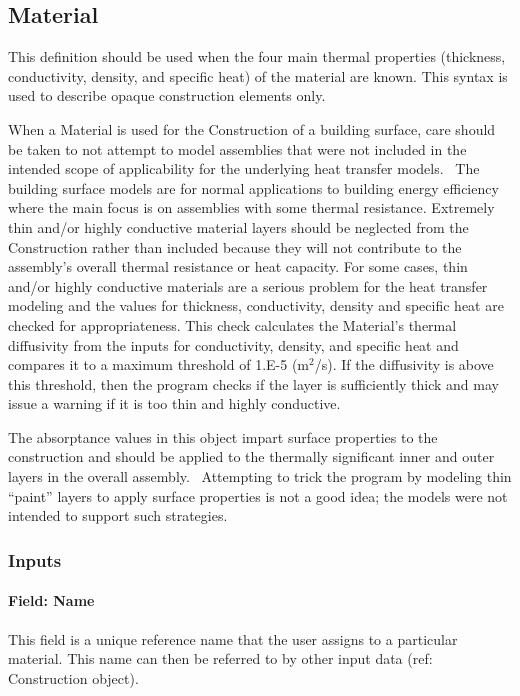 \subsection{Material}\label{material}

This definition should be used when the four main thermal properties (thickness, conductivity, density, and specific heat) of the material are known. This syntax is used to describe opaque construction elements only.

When a Material is used for the Construction of a building surface, care should be taken to not attempt to model assemblies that were not included in the intended scope of applicability for the underlying heat transfer models.~ The building surface models are for normal applications to building energy efficiency where the main focus is on assemblies with some thermal resistance. Extremely thin and/or highly conductive material layers should be neglected from the Construction rather than included because they will not contribute to the assembly's overall thermal resistance or heat capacity. For some cases, thin and/or highly conductive materials are a serious problem for the heat transfer modeling and the values for thickness, conductivity, density and specific heat are checked for appropriateness. This check calculates the Material's thermal diffusivity from the inputs for conductivity, density, and specific heat and compares it to a maximum threshold of 1.E-5 (m\(^{2}\)/s). If the diffusivity is above this threshold, then the program checks if the layer is sufficiently thick and may issue a warning if it is too thin and highly conductive.

The absorptance values in this object impart surface properties to the construction and should be applied to the thermally significant inner and outer layers in the overall assembly.~ Attempting to trick the program by modeling thin ``paint'' layers to apply surface properties is not a good idea; the models were not intended to support such strategies.

\subsubsection{Inputs}\label{inputs-046}

\paragraph{Field: Name}\label{field-name-045}

This field is a unique reference name that the user assigns to a particular material. This name can then be referred to by other input data (ref: Construction object).

